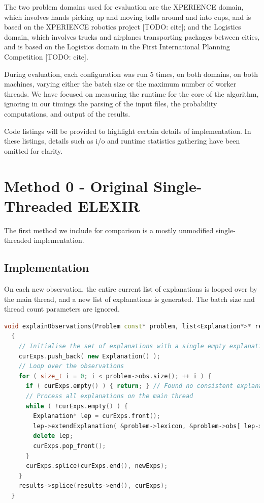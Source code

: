 \documentclass[12pt,twoside,abbrevs,msc,ai,notimes,logo,sansheadings]{infthesis}
\begin{document}
  The two problem domains used for evaluation are the XPERIENCE domain, which involves hands picking up and moving balls around and into cups, and is based on the XPERIENCE robotics project [TODO: cite]; and the Logistics domain, which involves trucks and airplanes transporting packages between cities, and is based on the Logistics domain in the First International Planning Competition [TODO: cite].
  
  During evaluation, each configuration was run 5 times, on both domains, on both machines, varying either the batch size or the maximum number of worker threads. We have focused on measuring the runtime for the core of the algorithm, ignoring in our timings the parsing of the input files, the probability computations, and output of the results.
  
  
  Code listings will be provided to highlight certain details of implementation. In these listings, details such as i/o and runtime statistics gathering have been omitted for clarity.
  
  \chapter {Method 0 - Original Single-Threaded ELEXIR}
  
  The first method we include for comparison is a mostly unmodified single-threaded implementation.
  
  \section {Implementation}
  
  On each new observation, the entire current list of explanations is looped over by the main thread, and a new list of explanations is generated. The batch size and thread count parameters are ignored.
  
  \begin{lstlisting}[language=C++]
  void explainObservations(Problem const* problem, list<Explanation*>* results)
  {
    // Initialise the set of explanations with a single empty explanation
    curExps.push_back( new Explanation() );
    // Loop over the observations
    for ( size_t i = 0; i < problem->obs.size(); ++ i ) {
      if ( curExps.empty() ) { return; } // Found no consistent explanations
      // Process all explanations on the main thread
      while ( !curExps.empty() ) {
        Explanation* lep = curExps.front();
        lep->extendExplanation( &problem->lexicon, &problem->obs[ lep->obsIndex ], &newExps );
        delete lep;
        curExps.pop_front();
      }
      curExps.splice(curExps.end(), newExps);
    }
    results->splice(results->end(), curExps);
  }
  \end{lstlisting}
  
\end{document}
